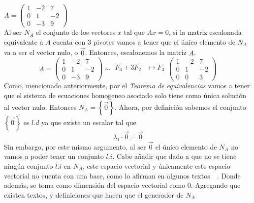 \begin{enumerate}[label=\listAlph]
            \(
                A = \left(\begin{smallmatrix}
                    1 & -2 & 7 \\
                    0 & 1 & -2 \\
                    0 & -3 & 9
                \end{smallmatrix}\right)
            \) \\
            Al ser \(N_A\) el conjunto de los vectores \(x\) tal que \(Ax = 0\), si la matriz escalonada equivalente a \(A\) cuenta con \(3\) pivotes 
            vamos a tener que el  único elemento de \(N_A\) va a ser el vector nulo, o \(\vec{0}\). Entonces, escalonemos la matriz \(A\).
            \[
                A = 
                \begin{pmatrix}
                    1 & -2 & 7 \\
                    0 & 1 & -2 \\
                    0 & -3 & 9
                \end{pmatrix}
                \sim
                \begin{aligned}
                    F_3 +3F_2 &\mapsto F_3 \\
                \end{aligned}
                \begin{pmatrix}
                    1 & -2 & 7 \\
                    0 & 1 & -2 \\
                    0 & 0 & 3
                \end{pmatrix}
            \]
            Como, mencionado anteriormente, por el \emph{Teorema de equivalencias} vamos a tener que el sistema de ecuaciones homogeneo asociado solo 
            tiene como única solución al vector nulo. Entonces \(N_A = \left\{\vec{0}\right\}\).
            Ahora, por definición sabemos el conjunto \(\left\{\vec{0}\right\}\) es \(l.d\) ya que existe un escalar tal que 
            \[
                \lambda_1 \cdot \vec{0} = \vec{0}
            \]
            Sin embargo, por este mismo argumento, al ser \(\vec{0}\) el único elemento de \(N_A\) no vamos a poder tener un conjunto \(l.i\). 
            Cabe añadir que dado a que no se tiene ningún conjunto \(l.i\) en \(N_A\), este espacio vectorial y únicamente este espacio vectorial 
            no cuenta con una base, como lo afirman en algunos textos~\cite{martinez_algebra_2024}~\cite{lipschutz_algebra_1991}. Donde además, 
            se toma como dimensión del espacio vectorial como 0. Agregando que existen textos, y definiciones que hacen que el generador de \(N_A\) 

\end{enumerate}
